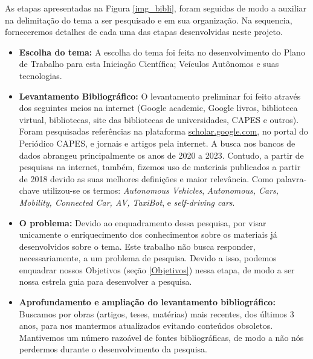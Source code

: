 As etapas apresentadas na Figura \ref{img_bibli}, foram seguidas de modo a auxiliar na
delimitação do tema a ser pesquisado e em sua organização. Na sequencia, forneceremos detalhes de cada uma das etapas desenvolvidas neste projeto.
\begin{itemize}\label{details}

\item \textbf{Escolha do tema:} A escolha do tema foi feita no desenvolvimento do Plano de Trabalho para esta Iniciação Científica; Veículos Autônomos e suas tecnologias. 

\item \textbf{Levantamento Bibliográfico:} O levantamento preliminar foi feito através dos seguintes meios na internet (Google academic, Google livros, biblioteca virtual, bibliotecas, site das bibliotecas de universidades, CAPES e outros). Foram pesquisadas referências na plataforma \url{scholar.google.com}, no portal do Periódico CAPES, e jornais e artigos pela internet. A busca nos bancos de dados abrangeu principalmente os anos de 2020 a 2023. Contudo, a partir de pesquisas na internet, também, fizemos uso de materiais publicados a partir de 2018 devido as suas melhores definições e maior relevância. Como palavra-chave utilizou-se os termos: \textit{Autonomous Vehicles}, \textit{Autonomous, Cars, Mobility, Connected Car, AV, TaxiBot}, e \textit{self-driving cars}.  %


\item \textbf{O problema:} Devido ao enquadramento dessa pesquisa, por visar unicamente o enriquecimento dos conhecimentos sobre os materiais já desenvolvidos sobre o tema. Este trabalho não busca responder, necessariamente, a um problema de pesquisa. Devido a isso, podemos enquadrar nossos Objetivos (seção \ref{Objetivos}) nessa etapa, de modo a ser nossa estrela guia para desenvolver a pesquisa.

\item \textbf{Aprofundamento e ampliação do levantamento bibliográfico:} Buscamos por obras (artigos, teses, matérias) mais recentes, dos últimos 3 anos, para nos mantermos atualizados evitando conteúdos obsoletos. Mantivemos um número razoável de fontes bibliográficas, de modo a não nós perdermos durante o desenvolvimento da pesquisa. 


\end{itemize}
